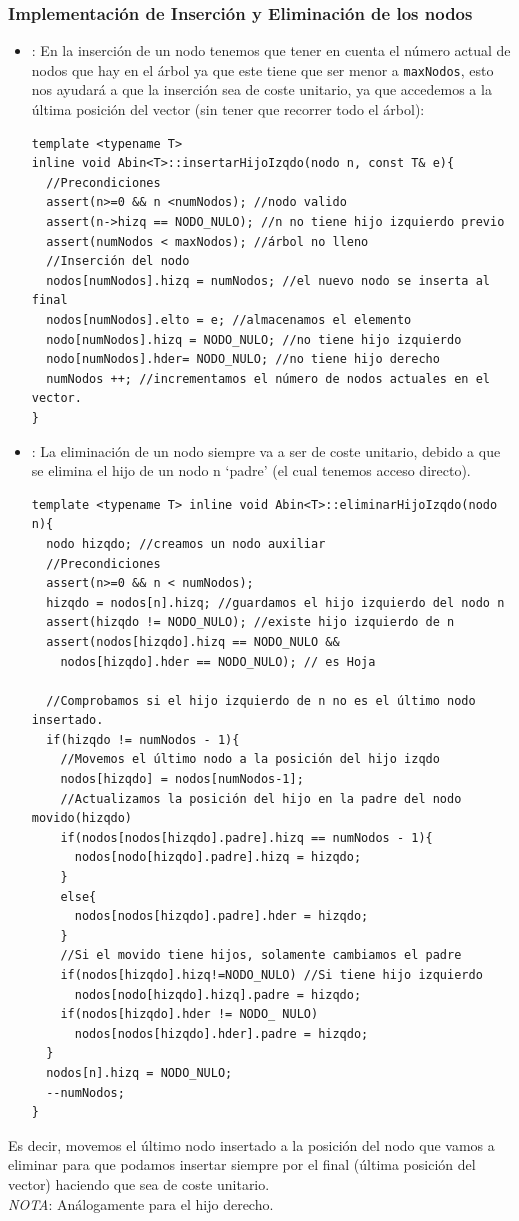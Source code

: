 \subsubsection*{Implementación de Inserción y Eliminación de los nodos}
\begin{itemize}
  \item {}: En la inserción de un nodo tenemos que tener en cuenta el número actual de nodos que hay en el árbol ya que este tiene que ser menor a \texttt{maxNodos}, esto nos ayudará a que la inserción sea de coste unitario, ya que accedemos a la última posición del vector (sin tener que recorrer todo el árbol):
  \begin{verbatim}
template <typename T>
inline void Abin<T>::insertarHijoIzqdo(nodo n, const T& e){
  //Precondiciones
  assert(n>=0 && n <numNodos); //nodo valido
  assert(n->hizq == NODO_NULO); //n no tiene hijo izquierdo previo
  assert(numNodos < maxNodos); //árbol no lleno
  //Inserción del nodo
  nodos[numNodos].hizq = numNodos; //el nuevo nodo se inserta al final
  nodos[numNodos].elto = e; //almacenamos el elemento
  nodo[numNodos].hizq = NODO_NULO; //no tiene hijo izquierdo
  nodo[numNodos].hder= NODO_NULO; //no tiene hijo derecho
  numNodos ++; //incrementamos el número de nodos actuales en el vector.
}
  \end{verbatim}
  \item {}: La eliminación de un nodo siempre va a ser de coste unitario, debido a que se elimina el hijo de un nodo n `padre' (el cual tenemos acceso directo).
  \begin{verbatim}
template <typename T> inline void Abin<T>::eliminarHijoIzqdo(nodo n){
  nodo hizqdo; //creamos un nodo auxiliar
  //Precondiciones
  assert(n>=0 && n < numNodos);
  hizqdo = nodos[n].hizq; //guardamos el hijo izquierdo del nodo n
  assert(hizqdo != NODO_NULO); //existe hijo izquierdo de n
  assert(nodos[hizqdo].hizq == NODO_NULO &&
    nodos[hizqdo].hder == NODO_NULO); // es Hoja
  
  //Comprobamos si el hijo izquierdo de n no es el último nodo insertado.
  if(hizqdo != numNodos - 1){
    //Movemos el último nodo a la posición del hijo izqdo
    nodos[hizqdo] = nodos[numNodos-1];
    //Actualizamos la posición del hijo en la padre del nodo movido(hizqdo)
    if(nodos[nodos[hizqdo].padre].hizq == numNodos - 1){
      nodos[nodo[hizqdo].padre].hizq = hizqdo;
    }
    else{
      nodos[nodos[hizqdo].padre].hder = hizqdo;
    }
    //Si el movido tiene hijos, solamente cambiamos el padre
    if(nodos[hizqdo].hizq!=NODO_NULO) //Si tiene hijo izquierdo
      nodos[nodo[hizqdo].hizq].padre = hizqdo;
    if(nodos[hizqdo].hder != NODO_ NULO)
      nodos[nodos[hizqdo].hder].padre = hizqdo;
  }
  nodos[n].hizq = NODO_NULO;
  --numNodos;
}
  \end{verbatim}
\end{itemize}
Es decir, movemos el último nodo insertado a la posición del nodo que vamos a eliminar para que podamos insertar siempre por el final (última posición del vector) haciendo que sea de coste unitario.\\
\textit{NOTA}: Análogamente para el hijo derecho.
